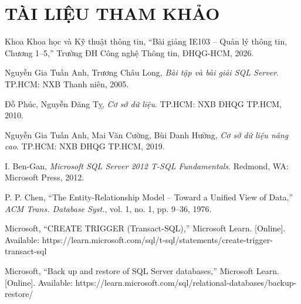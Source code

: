 \documentclass[a4paper,oneside]{report}
\begin{document}
\chapter*{TÀI LIỆU THAM KHẢO}
\begin{enumerate}[label={[\arabic*]}, leftmargin=2.2em]
\item Khoa Khoa học và Kỹ thuật thông tin, “Bài giảng IE103 – Quản lý thông tin, Chương 1–5,” Trường ĐH Công nghệ Thông tin, ĐHQG-HCM, 2026.
\item Nguyễn Gia Tuấn Anh, Trương Châu Long, \textit{Bài tập và bài giải SQL Server}. TP.HCM: NXB Thanh niên, 2005.
\item Đỗ Phúc, Nguyễn Đăng Tỵ, \textit{Cơ sở dữ liệu}. TP.HCM: NXB ĐHQG TP.HCM, 2010.
\item Nguyễn Gia Tuấn Anh, Mai Văn Cường, Bùi Danh Hường, \textit{Cơ sở dữ liệu nâng cao}. TP.HCM: NXB ĐHQG TP.HCM, 2019.
\item I. Ben-Gan, \textit{Microsoft SQL Server 2012 T-SQL Fundamentals}. Redmond, WA: Microsoft Press, 2012.
\item P. P. Chen, “The Entity-Relationship Model – Toward a Unified View of Data,” \textit{ACM Trans. Database Syst.}, vol. 1, no. 1, pp. 9–36, 1976.
\item Microsoft, “CREATE TRIGGER (Transact-SQL),” Microsoft Learn. [Online]. Available: https://learn.microsoft.com/sql/t-sql/statements/create-trigger-transact-sql
\item Microsoft, “Back up and restore of SQL Server databases,” Microsoft Learn. [Online]. Available: https://learn.microsoft.com/sql/relational-databases/backup-restore/
\end{enumerate}
\end{document}
